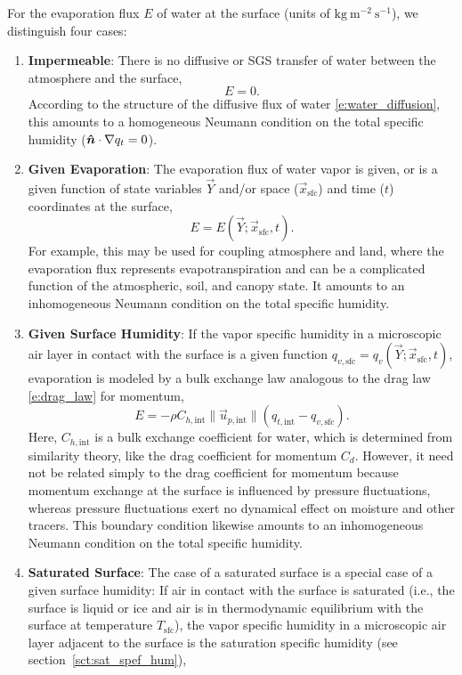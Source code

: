 \documentclass{report}
\begin{document}
For the evaporation flux $E$ of water at the surface (units of $\mathrm{kg~m^{-2}~s^{-1}}$), we distinguish four cases:
\begin{enumerate}
    \item \textbf{Impermeable}: There is no diffusive or SGS transfer of water between the atmosphere and the surface,
    \[
    E = 0.
    \]
    According to the structure of the diffusive flux of water \eqref{e:water_diffusion}, this amounts to a homogeneous Neumann condition on the total specific humidity ($\boldsymbol{{\hat n}}\cdot\nabla q_t = 0$).
    \item \textbf{Given Evaporation}: The evaporation flux of water vapor is given, or is a given function of state variables $\vec{Y}$ and/or space ($\vec{x}_\mathrm{sfc}$) and time ($t$) coordinates at the surface,
    \[
    E = E(\vec{Y}; \vec{x}_\mathrm{sfc}, t).
    \]
    For example, this may be used for coupling atmosphere and land, where the evaporation flux represents evapotranspiration and can be a complicated function of the atmospheric, soil, and canopy state. It amounts to an inhomogeneous Neumann condition on the total specific humidity.
    \item \textbf{Given Surface Humidity}: If the vapor specific humidity in a microscopic air layer in contact with the surface is a given function $q_{v, \mathrm{sfc}} = q_{v}(\vec{Y}; \vec{x}_\mathrm{sfc}, t)$, evaporation is modeled by a bulk exchange law analogous to the drag law \eqref{e:drag_law} for momentum,
    \begin{equation}\label{e:sfc_evaporation}
    E = - \rho C_{h, \mathrm{int}} \| \vec{u}_{p, \mathrm{int}} \| \left( q_{t, \mathrm{int}} - q_{v, \mathrm{sfc}} \right).
    \end{equation} 
    Here, $C_{h, \mathrm{int}}$ is a bulk exchange coefficient for water, which is determined from similarity theory, like the drag coefficient for momentum $C_d$. However, it need not be related simply to the drag coefficient for momentum because momentum exchange at the surface is influenced by pressure fluctuations, whereas pressure fluctuations exert no dynamical effect on moisture and other tracers. This boundary condition likewise amounts to an inhomogeneous Neumann condition on the total specific humidity.
    \item \textbf{Saturated Surface}: The case of a saturated surface is a special case of a given surface humidity: If air in contact with the surface is saturated (i.e., the surface is liquid or ice and air is in thermodynamic equilibrium with the surface at temperature $T_\mathrm{sfc}$), the vapor specific humidity in a microscopic air layer adjacent to the surface is the saturation specific humidity (see section~\ref{sct:sat_spef_hum}),

\end{enumerate}
\end{document}

